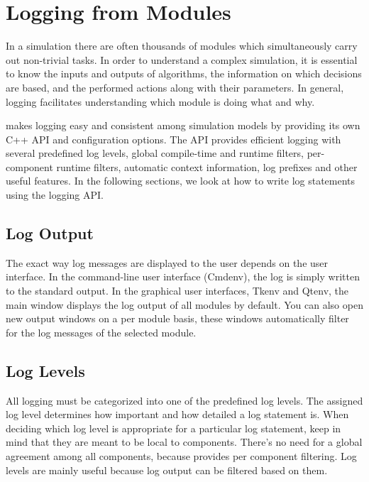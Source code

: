 \section{Logging from Modules}
\label{sec:sim-lib:logging-from-modules}

In a simulation there are often thousands of modules which simultaneously carry
out non-trivial tasks. In order to understand a complex simulation, it is
essential to know the inputs and outputs of algorithms, the information on
which decisions are based, and the performed actions along with their parameters.
In general, logging facilitates understanding which module is doing what and why.

{\opp} makes logging easy and consistent among simulation models by providing
its own C++ API and configuration options. The API provides efficient logging
with several predefined log levels, global compile-time and runtime filters,
per-component runtime filters, automatic context information, log prefixes and
other useful features. In the following sections, we look at how to write log
statements using the {\opp} logging API.

\subsection{Log Output}
\label{sec:sim-lib:log-output}

The exact way log messages are displayed to the user depends on the user interface.
In the command-line user interface (Cmdenv), the log is simply
written to the standard output. In the graphical user interfaces, Tkenv and Qtenv,
the main window displays the log output of all modules by default. You can also
open new output windows on a per module basis, these windows automatically filter
for the log messages of the selected module.

\subsection{Log Levels}
\label{sec:sim-lib:log-levels}

All logging must be categorized into one of the predefined log levels. The
assigned log level determines how important and how detailed a log statement
is. When deciding which log level is appropriate for a particular log statement,
keep in mind that they are meant to be local to components. There's no need for
a global agreement among all components, because {\opp} provides per component
filtering. Log levels are mainly useful because log output can be filtered
based on them.

